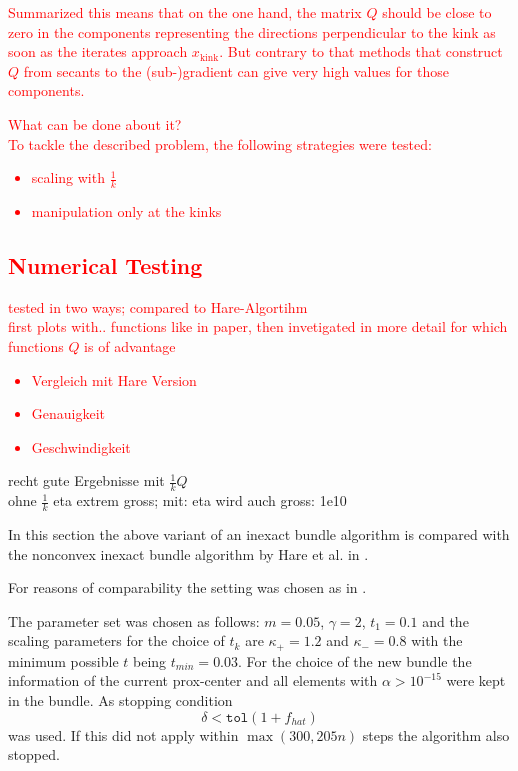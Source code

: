 \textcolor{red}{Summarized this means that on the one hand, the matrix \(Q\) should be close to zero in the components representing the directions perpendicular to the kink as soon as the iterates approach \(x_{\text{kink}}\). But contrary to that methods that construct \(Q\) from secants to the (sub-)gradient can give very high values for those components.}

\textcolor{red}{What can be done about it?\\
To tackle the described problem, the following strategies were tested: 
\begin{itemize}
	\item scaling with \(\frac{1}{k}\)
	\item manipulation only at the kinks
\end{itemize}}

\subsection{\textcolor{red}{Numerical Testing}}

\textcolor{red}{tested in two ways; compared to Hare-Algortihm\\
first plots with.. functions like in paper, then invetigated in more detail for which functions \(Q\) is of advantage\\}

\textcolor{red}{
\begin{itemize}
	\item Vergleich mit Hare Version
	\item Genauigkeit
	\item Geschwindigkeit
\end{itemize}}

recht gute Ergebnisse mit \(\frac{1}{k}Q\)\\
ohne \(\frac{1}{k}\) eta extrem gross; mit: eta wird auch gross: 1e10

In this section the above variant of an inexact bundle algorithm is compared with the nonconvex inexact bundle algorithm by Hare et al. in \cite{Hare2016}.

For reasons of comparability the setting was chosen as in \cite{Hare2016}.

The parameter set was chosen as follows: \(m = 0.05\), \(\gamma = 2\), \(t_1 = 0.1\) and the scaling parameters for the choice of \(t_k\) are \(\kappa_{+}=1.2\) and \(\kappa_{-}=0.8\) with the minimum possible \(t\) being \(t_{min}=0.03\).
For the choice of the new bundle the information of the current prox-center and all elements with \(\alpha > 10^{-15}\) were kept in the bundle.
As stopping condition  
\[ \delta < \mathtt{tol}(1+f_{hat}) \]
was used.
If this did not apply within \(\max(300,205n)\) steps the algorithm also stopped.

